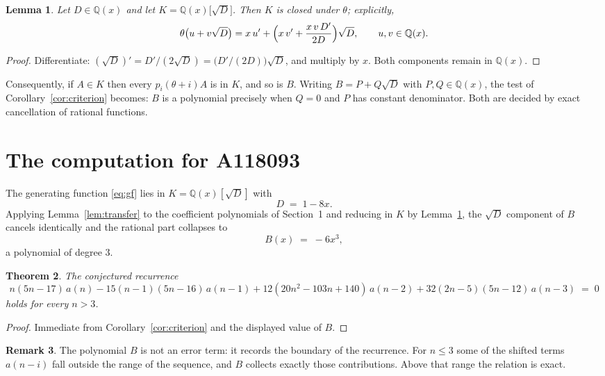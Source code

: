 \documentclass[11pt,a4paper]{article}
\theoremstyle{plain}
\newtheorem{theorem}{Theorem}
\newtheorem{lemma}[theorem]{Lemma}
\theoremstyle{definition}
\newtheorem{remark}[theorem]{Remark}
\begin{document}
\begin{lemma}\label{lem:field}
Let $D\in\mathbb{Q}(x)$ and let $K=\mathbb{Q}(x)\bigl[\sqrt{D}\bigr]$. Then $K$ is closed
under $\theta$; explicitly,
\[
\theta\bigl(u+v\sqrt{D}\bigr)=x\,u'+\Bigl(x\,v'+\frac{x\,v\,D'}{2D}\Bigr)\sqrt{D},
\qquad u,v\in\mathbb{Q}(x).
\]
\end{lemma}

\begin{proof}
Differentiate: $(\sqrt{D})'=D'/(2\sqrt{D})=\bigl(D'/(2D)\bigr)\sqrt{D}$, and multiply by
$x$. Both components remain in $\mathbb{Q}(x)$.
\end{proof}

Consequently, if $A\in K$ then every $p_{i}(\theta+i)A$ is in $K$, and so is $B$. Writing
$B=P+Q\sqrt{D}$ with $P,Q\in\mathbb{Q}(x)$, the test of Corollary~\ref{cor:criterion}
becomes: $B$ is a polynomial precisely when $Q=0$ and $P$ has constant denominator. Both
are decided by exact cancellation of rational functions.

\section{The computation for A118093}

The generating function \eqref{eq:gf} lies in $K=\mathbb{Q}(x)[\sqrt{D}]$ with
\[
D \;=\; 1 - 8 x .
\]
Applying Lemma~\ref{lem:transfer} to the coefficient polynomials of Section~1 and reducing
in $K$ by Lemma~\ref{lem:field}, the $\sqrt{D}$ component of $B$ cancels identically and
the rational part collapses to
\[
B(x)\;=\;- 6 x^{3} ,
\]
a polynomial of degree $3$.

\begin{theorem}
The conjectured recurrence
\[
n \left(5 n - 17\right)\,a(n) -  15 \left(n - 1\right) \left(5 n - 16\right)\,a(n-1) + 12 \left(20 n^{2} - 103 n + 140\right)\,a(n-2) + 32 \left(2 n - 5\right) \left(5 n - 12\right)\,a(n-3) \;=\;0
\]
holds for every $n>3$.
\end{theorem}

\begin{proof}
Immediate from Corollary~\ref{cor:criterion} and the displayed value of $B$.
\end{proof}

\begin{remark}
The polynomial $B$ is not an error term: it records the boundary of the recurrence. For
$n\le3$ some of the shifted terms $a(n-i)$ fall outside the range of the sequence,
and $B$ collects exactly those contributions. Above that range the relation is exact.
\end{remark}
\end{document}
